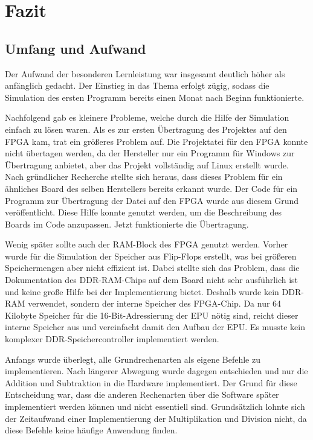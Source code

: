 \chapter{Fazit}
\label{c:fazit}
\section{Umfang und Aufwand}
Der Aufwand der besonderen Lernleistung war insgesamt deutlich höher als
anfänglich gedacht. Der Einstieg in das Thema erfolgt zügig, sodass die
Simulation des ersten Programm bereits einen Monat nach Beginn funktionierte.

Nachfolgend gab es kleinere Probleme, welche durch die Hilfe der Simulation
einfach zu lösen waren. Als es zur ersten Übertragung des Projektes auf den
\ac{FPGA} kam, trat ein größeres Problem auf. Die Projektatei für den \ac{FPGA}
konnte nicht übertagen werden, da der Hersteller nur ein Programm für Windows
zur Übertragung anbietet, aber das Projekt vollständig auf Linux erstellt wurde.
Nach gründlicher Recherche stellte sich heraus, dass dieses Problem für ein
ähnliches Board des selben Herstellers bereits erkannt wurde.  Der Code für ein
Programm zur Übertragung der Datei auf den \ac{FPGA} wurde aus diesem Grund
veröffentlicht. Diese Hilfe konnte genutzt werden, um die
Beschreibung des Boards im Code anzupassen. Jetzt funktionierte die
Übertragung.~\cite{numatoloader}

Wenig später sollte auch der RAM-Block des \ac{FPGA} genutzt werden. Vorher
wurde für die Simulation der Speicher aus Flip-Flops erstellt, was bei größeren
Speichermengen aber nicht effizient ist. Dabei stellte sich das Problem, dass
die Dokumentation des DDR-RAM-Chips auf dem Board nicht sehr ausführlich ist und
keine große Hilfe bei der Implementierung bietet. Deshalb wurde kein DDR-RAM
verwendet, sondern der interne Speicher des \ac{FPGA}-Chip. Da nur 64 Kilobyte
Speicher für die 16-Bit-Adressierung der \ac{EPU} nötig sind, reicht dieser
interne Speicher aus und vereinfacht damit den Aufbau der \ac{EPU}. Es musste
kein komplexer DDR-Speichercontroller implementiert werden.

Anfangs wurde überlegt, alle Grundrechenarten als eigene Befehle zu
implementieren. Nach längerer Abwegung wurde dagegen entschieden und nur die
Addition und Subtraktion in die Hardware implementiert. Der Grund für diese
Entscheidung war, dass die anderen Rechenarten über die Software später
implementiert werden können und nicht essentiell sind. Grundsätzlich lohnte sich
der Zeitaufwand einer Implementierung der Multiplikation und
Division nicht, da diese Befehle keine häufige Anwendung finden.

